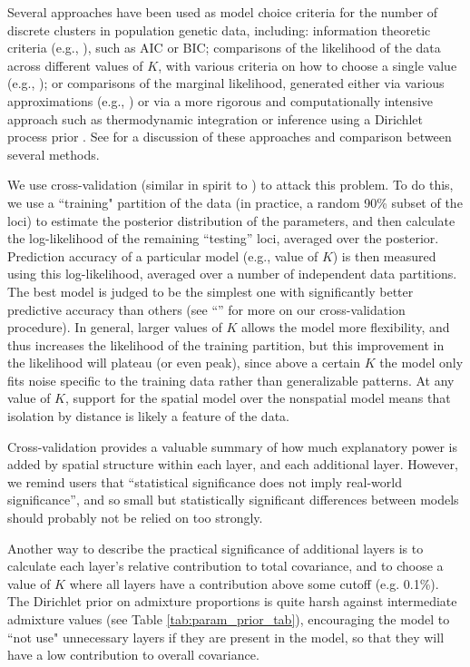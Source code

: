 \documentclass[10pt,letterpaper]{article}
\newcommand{\secref}[1]{``\nameref{#1}''}
\begin{document}
Several approaches have been used as model choice criteria 
for the number of discrete clusters in population genetic data, including: 
information theoretic criteria (e.g., \cite{ADMIXTURE}), such as AIC or BIC;
comparisons of the likelihood of the data across different values of $K$, 
with various criteria on how to choose a single value (e.g., \cite{Evanno2005});
or comparisons of the marginal likelihood, 
generated either via various approximations (e.g., \cite{STRUCTURE})
or via a more rigorous and computationally intensive approach such as thermodynamic integration \cite{verity_nichols2016}
or inference using a Dirichlet process prior \cite{huelsenbeck2007inference}.
See \cite{verity_nichols2016} for a discussion of these approaches and comparison
between several methods.

We use cross-validation (similar in spirit to \cite{ADMIXTURE_xval}) to attack this problem.
To do this,
we use a ``training" partition of the data (in practice, a random 90\% subset of the loci)
to estimate the posterior distribution of the parameters,
and then calculate the log-likelihood of the remaining ``testing'' loci,
averaged over the posterior.
Prediction accuracy of a particular model (e.g., value of $K$)
is then measured using this log-likelihood,
averaged over a number of independent data partitions.
The best model is judged to be the simplest one with significantly better predictive accuracy
than others (see \secref{Xvalidation} for more on our cross-validation procedure).
In general, larger values of $K$ allows the model more flexibility,
and thus increases the likelihood of the training partition, 
but this improvement in the likelihood will plateau (or even peak), 
since above a certain $K$ the model only fits noise specific to the training data 
rather than generalizable patterns.
At any value of $K$, support for the spatial model over the nonspatial model 
means that isolation by distance is likely a feature of the data.

Cross-validation provides a valuable summary of how much explanatory power
is added by spatial structure within each layer, and each additional layer.
However, we remind users that ``statistical significance does not imply real-world significance'',
and so small but statistically significant differences between models
should probably not be relied on too strongly.

Another way to describe the practical significance of additional layers
is to calculate each layer's relative contribution to total covariance, 
and to choose a value of $K$ where all layers have a contribution above some cutoff (e.g. 0.1\%).
The Dirichlet prior on admixture proportions
is quite harsh against intermediate admixture values (see Table \ref{tab:param_prior_tab}),  
encouraging the model to ``not use" unnecessary layers if they are
present in the model, 
so that they will have a low contribution to overall covariance.
\end{document}
